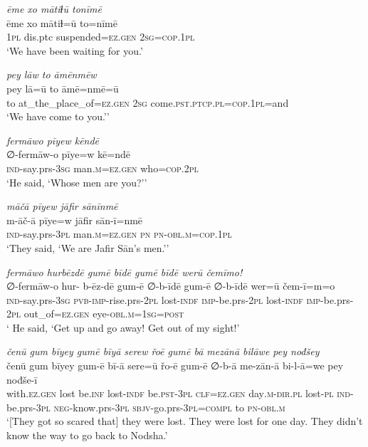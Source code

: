 \ea \label{ŠJ.31}
\textit{ēme xo mātiɫū tonīmē} \\ 
\gll ēme xo mātiɫ=ū to=nīmē \\ 
 \textsc{1pl} dis.ptc suspended\textsc{=ez.gen} \textsc{2sg}\textsc{=cop}\textsc{.\textsc{1pl}} \\ 
\glt `We have been waiting for you.'
\z 
 
\ea \label{ŠJ.32}
\textit{pey lāw to āmēnmēw} \\ 
\gll pey lā=ū to āmē=nmē=ū \\ 
 to at\_the\_place\_of\textsc{=ez.gen} \textsc{2sg} come\textsc{.pst}\textsc{.ptcp}\textsc{.pl}\textsc{=cop}\textsc{.\textsc{1pl}}=and \\ 
\glt `We have come to you.’'
\z 
 
\ea \label{ŠJ.33}
\textit{fermāwo pīyew kēndē} \\ 
\gll ∅-fermāw-o pīye=w kē=ndē \\ 
 \textsc{ind-}say.prs\textsc{-3sg} man\textsc{.m}\textsc{=ez.gen} who\textsc{=cop}.\textsc{2pl} \\ 
\glt `He said, ‘Whose men are you?’'
\z 
 
\ea \label{ŠJ.34}
\textit{māčā pīyew jāfir sānīnmē} \\ 
\gll m-āč-ā pīye=w jāfir sān-ī=nmē \\ 
 \textsc{ind-}say.prs\textsc{-3pl} man\textsc{.m}\textsc{=ez.gen} \textsc{pn} \textsc{pn}\textsc{-obl}\textsc{.m}\textsc{=cop}\textsc{.\textsc{1pl}} \\ 
\glt `They said, ‘We are Jafir Sān’s men.’'
\z 
 
\ea \label{ŠJ.37}
\textit{fermāwo hurbēzdē gumē bīdē gumē bīdē werū čemīmo!} \\ 
\gll ∅-fermāw-o hur- b-ēz-dē gum-ē ∅-b-īdē gum-ē ∅-b-īdē wer=ū čem-ī=m=o \\ 
 \textsc{ind-}say.prs\textsc{-3sg} \textsc{pvb-}\textsc{imp-}rise.prs-\textsc{2pl} lost\textsc{-indf} \textsc{imp-}be.prs-\textsc{2pl} lost\textsc{-indf} \textsc{imp-}be.prs-\textsc{2pl} out\_of\textsc{=ez.gen} eye\textsc{-obl}\textsc{.m}\textsc{=\textsc{1sg}}\textsc{=\textsc{post}} \\ 
\glt ` He said, ‘Get up and go away! Get out of my sight!'
\z 
 
\ea \label{ŠJ.39}
\textit{čenū gum bīyey gumē bīyā serew řoē gumē bā mezānā bilāwe pey nođšey} \\ 
\gll čenū gum bīyey gum-ē bī-ā sere=ū řo-ē gum-ē ∅-b-ā me-zān-ā bi-l-ā=we pey nođše-ī \\ 
 with\textsc{.ez.gen} lost be\textsc{.inf} lost\textsc{-indf} be\textsc{.pst}\textsc{-3pl} \textsc{clf}\textsc{=ez.gen} day\textsc{.m}\textsc{-dir}\textsc{.pl} lost\textsc{\textsc{-pl}} \textsc{ind-}be.prs\textsc{-3pl} \textsc{neg-}know.prs\textsc{-3pl} \textsc{sbjv-}go.prs\textsc{-3pl}\textsc{=compl} to \textsc{pn}\textsc{-obl}\textsc{.m} \\ 
\glt `[They got so scared that] they were lost. They were lost for one day. They didn’t know the way to go back to Nodsha.'
\z 
 
